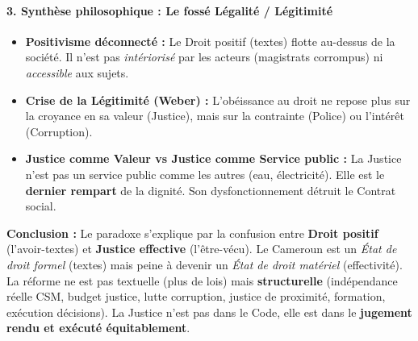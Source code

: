 \documentclass[11pt]{article}
\newcommand{\cle}[1]{{\popxbold\color{popdark}#1}}
\begin{document}
\begin{exoresolu}
    \paragraph{3. Synthèse philosophique : Le fossé Légalité / Légitimité}
    \begin{itemize}
        \item \textbf{Positivisme déconnecté :} Le Droit positif (textes) flotte au-dessus de la société. Il n'est pas \emph{intériorisé} par les acteurs (magistrats corrompus) ni \emph{accessible} aux sujets.
        \item \textbf{Crise de la \cle{Légitimité} (Weber) :} L'obéissance au droit ne repose plus sur la croyance en sa valeur (Justice), mais sur la contrainte (Police) ou l'intérêt (Corruption).
        \item \textbf{Justice comme \cle{Valeur} vs Justice comme \cle{Service public} :} La Justice n'est pas un service public comme les autres (eau, électricité). Elle est le \textbf{dernier rempart} de la dignité. Son dysfonctionnement détruit le \cle{Contrat social}.
    \end{itemize}
    \textbf{Conclusion :} Le paradoxe s'explique par la confusion entre \textbf{Droit positif} (l'avoir-textes) et \textbf{Justice effective} (l'être-vécu). Le Cameroun est un \emph{État de droit formel} (textes) mais peine à devenir un \emph{État de droit matériel} (effectivité). La réforme ne est pas textuelle (plus de lois) mais \textbf{structurelle} (indépendance réelle CSM, budget justice, lutte corruption, justice de proximité, formation, exécution décisions). La Justice n'est pas dans le Code, elle est dans le \textbf{jugement rendu et exécuté équitablement}.
\end{exoresolu}
\end{document}
